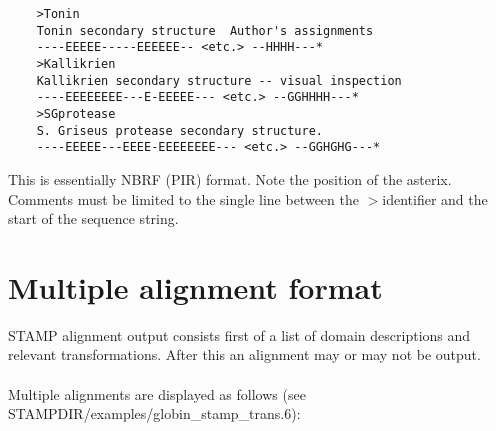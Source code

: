     \begin{scriptsize}\begin{verbatim}
    >Tonin
    Tonin secondary structure  Author's assignments
    ----EEEEE-----EEEEEE-- <etc.> --HHHH---*
    >Kallikrien
    Kallikrien secondary structure -- visual inspection
    ----EEEEEEEE---E-EEEEE--- <etc.> --GGHHHH---*
    >SGprotease
    S. Griseus protease secondary structure.
    ----EEEEE---EEEE-EEEEEEEE--- <etc.> --GGHGHG---*
    \end{verbatim} \end{scriptsize}

    This is essentially NBRF (PIR) format.  Note the position of the asterix.  
    Comments must be limited to the single line between the $>$identifier and 
    the start of the sequence string.

    \section{Multiple alignment format}

    STAMP alignment output consists first of a list of domain descriptions and 
    relevant transformations.  After this an alignment may or may not
    be output. \\
    \\
    Multiple alignments are displayed as follows (see 
    STAMPDIR/examples/globin\_stamp\_trans.6):\\

